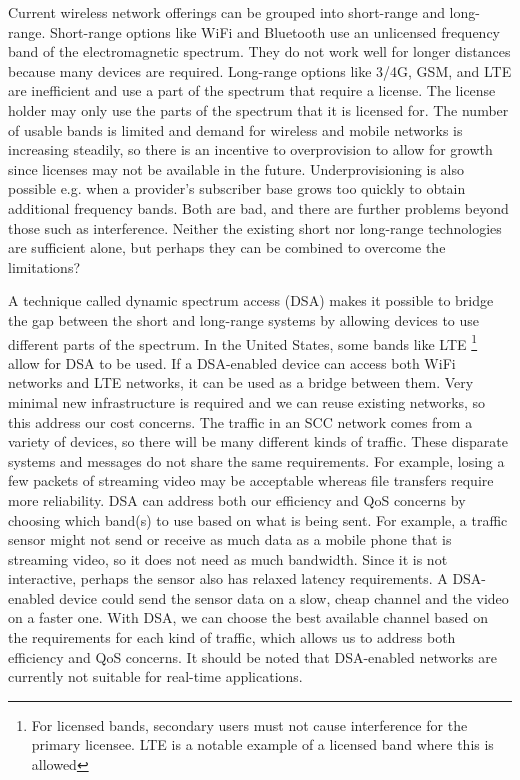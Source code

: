 \documentclass[]{article}
\begin{document}
Current wireless network offerings can be grouped into short-range and long-range. Short-range options like WiFi and Bluetooth use an unlicensed frequency band of the electromagnetic spectrum. They do not work well for longer distances because many devices are required. Long-range options like 3/4G, GSM, and LTE are inefficient and use a part of the spectrum that require a license. The license holder may only use the parts of the spectrum that it is licensed for. The number of usable bands is limited and demand for wireless and mobile networks is increasing steadily, so there is an incentive to overprovision to allow for growth since licenses may not be available in the future. Underprovisioning is also possible e.g. when a provider's subscriber base grows too quickly to obtain additional frequency bands. Both are bad, and there are further problems beyond those such as interference. Neither the existing short nor long-range technologies are sufficient alone, but perhaps they can be combined to overcome the limitations?

A technique called dynamic spectrum access (DSA) makes it possible to bridge the gap between the short and long-range systems by allowing devices to use different parts of the spectrum. In the United States, some bands like LTE \footnote{For licensed bands, secondary users must not cause interference for the primary licensee. LTE is a notable example of a licensed band where this is allowed} allow for DSA to be used. If a DSA-enabled device can access both WiFi networks and LTE networks, it can be used as a bridge between them. Very minimal new infrastructure is required and we can reuse existing networks, so this address our cost concerns. 
The traffic in an SCC network comes from a variety of devices, so there will be many different kinds of traffic. These disparate systems and messages do not share the same requirements. For example, losing a few packets of streaming video may be acceptable whereas file transfers require more reliability. DSA can address both our efficiency and QoS concerns by choosing which band(s) to use based on what is being sent. For example, a traffic sensor might not send or receive as much data as a mobile phone that is streaming video, so it does not need as much bandwidth. Since it is not interactive, perhaps the sensor also has relaxed latency requirements. A DSA-enabled device could send the sensor data on a slow, cheap channel and the video on a faster one. With DSA, we can choose the best available channel based on the requirements for each kind of traffic, which allows us to address both efficiency and QoS concerns. It should be noted that DSA-enabled networks are currently not suitable for real-time applications.
\end{document}
